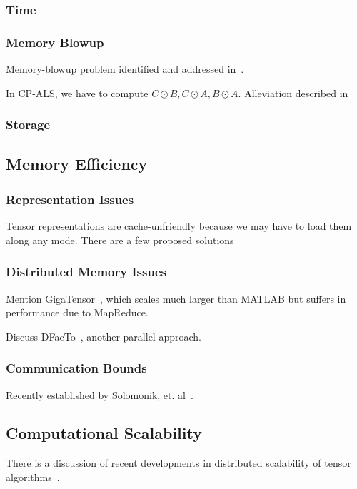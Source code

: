 \documentclass[leqno,onefignum,onetabnum]{siamltex1213}
\begin{document}
\subsubsection{Time}

\subsubsection{Memory Blowup}
Memory-blowup problem identified and addressed in~\cite{Kolda08scalabletensor}.

In CP-ALS, we have to compute $C\odot B, C\odot A, B\odot A$. Alleviation described in~\cite{Bader07efficientmatlab}

\subsubsection{Storage}

\subsection{Memory Efficiency}

\subsubsection{Representation Issues}
Tensor representations are cache-unfriendly because we may have to load them along any mode.
There are a few proposed solutions~\cite{6408676}

\subsubsection{Distributed Memory Issues}
Mention GigaTensor~\cite{Kang:2012}, which scales much larger than MATLAB but suffers in performance due to MapReduce. 

Discuss DFacTo~\cite{NIPS2014_5395}, another parallel approach. 

\subsubsection{Communication Bounds}
Recently established by Solomonik, et. al~\cite{commlow}.

\subsection{Computational Scalability}
There is a discussion of recent developments in distributed scalability of tensor algorithms~\cite{falbull}.
\end{document}
